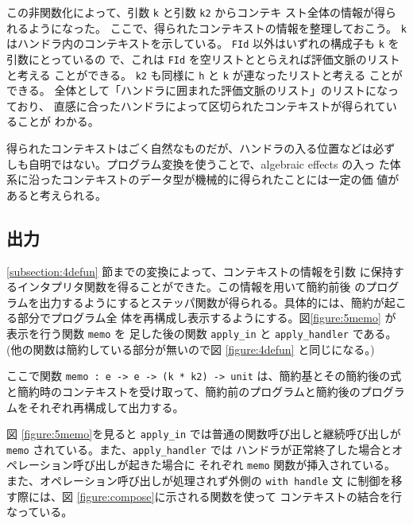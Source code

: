 この非関数化によって、引数 \texttt{k} と引数 \texttt{k2} からコンテキ
スト全体の情報が得られるようになった。
ここで、得られたコンテキストの情報を整理しておこう。
\texttt{k} はハンドラ内のコンテキストを示している。
\texttt{FId} 以外はいずれの構成子も \texttt{k} を引数にとっているの
で、これは \texttt{FId} を空リストととらえれば評価文脈のリストと考える
ことができる。
\texttt{k2} も同様に \texttt{h} と \texttt{k} が連なったリストと考える
ことができる。
全体として「ハンドラに囲まれた評価文脈のリスト」のリストになっており、
直感に合ったハンドラによって区切られたコンテキストが得られていることが
わかる。

得られたコンテキストはごく自然なものだが、ハンドラの入る位置などは必ず
しも自明ではない。プログラム変換を使うことで、algebraic effects の入っ
た体系に沿ったコンテキストのデータ型が機械的に得られたことには一定の価
値があると考えられる。

\subsection{出力}
\label{subsection:memo}

\ref{subsection:4defun} 節までの変換によって、コンテキストの情報を引数
に保持するインタプリタ関数を得ることができた。この情報を用いて簡約前後
のプログラムを出力するようにするとステッパ関数が得られる。具体的には、簡約が起こる部分でプログラム全
体を再構成し表示するようにする。図\ref{figure:5memo}
が表示を行う関数 \texttt{memo} を
足した後の関数 \texttt{apply\_in} と \texttt{apply\_handler}
である。
(他の関数は簡約している部分が無いので図 \ref{figure:4defun} と同じになる。)

ここで関数 \texttt{memo :\ e -> e -> (k * k2) -> unit} は、簡約基とその簡約後の式と簡約時のコンテキストを受け取って、簡約前のプログラムと簡約後のプログラムをそれぞれ再構成して出力する。

図 \ref{figure:5memo}を見ると \texttt{apply\_in} では普通の関数呼び出しと継続呼び出しが
\texttt{memo} されている。また、\texttt{apply\_handler} では
ハンドラが正常終了した場合とオペレーション呼び出しが起きた場合に
それぞれ \texttt{memo} 関数が挿入されている。
また、オペレーション呼び出しが処理されず外側の \texttt{with handle} 文
に制御を移す際には、図 \ref{figure:compose}に示される関数を使って
コンテキストの結合を行なっている。

